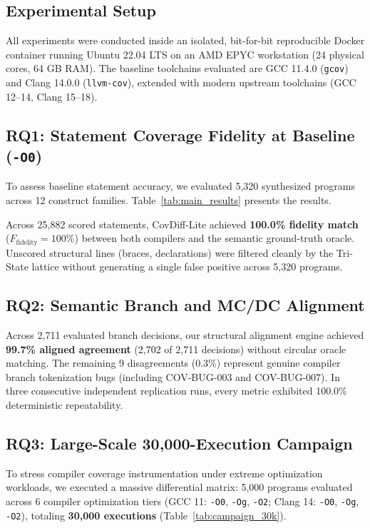 \documentclass[sigconf,review,anonymous=false]{acmart}
\theoremstyle{definition}
\begin{document}
\subsection{Experimental Setup}
All experiments were conducted inside an isolated, bit-for-bit reproducible Docker container running Ubuntu 22.04 LTS on an AMD EPYC workstation (24 physical cores, 64 GB RAM). The baseline toolchains evaluated are GCC 11.4.0 (\texttt{gcov}) and Clang 14.0.0 (\texttt{llvm-cov}), extended with modern upstream toolchains (GCC 12--14, Clang 15--18).

\subsection{RQ1: Statement Coverage Fidelity at Baseline (\texttt{-O0})}
To assess baseline statement accuracy, we evaluated 5,320 synthesized programs across 12 construct families. Table~\ref{tab:main_results} presents the results.



Across 25,882 scored statements, CovDiff-Lite achieved \textbf{100.0\% fidelity match} ($F_{\text{fidelity}} = 100\%$) between both compilers and the semantic ground-truth oracle. Unscored structural lines (braces, declarations) were filtered cleanly by the Tri-State lattice without generating a single false positive across 5,320 programs.

\subsection{RQ2: Semantic Branch and MC/DC Alignment}
Across 2,711 evaluated branch decisions, our structural alignment engine achieved \textbf{99.7\% aligned agreement} (2,702 of 2,711 decisions) without circular oracle matching. The remaining 9 disagreements (0.3\%) represent genuine compiler branch tokenization bugs (including COV-BUG-003 and COV-BUG-007). In three consecutive independent replication runs, every metric exhibited 100.0\% deterministic repeatability.

\subsection{RQ3: Large-Scale 30,000-Execution Campaign}
To stress compiler coverage instrumentation under extreme optimization workloads, we executed a massive differential matrix: 5,000 programs evaluated across 6 compiler optimization tiers (GCC 11: \texttt{-O0}, \texttt{-Og}, \texttt{-O2}; Clang 14: \texttt{-O0}, \texttt{-Og}, \texttt{-O2}), totaling \textbf{30,000 executions} (Table~\ref{tab:campaign_30k}).
\end{document}
